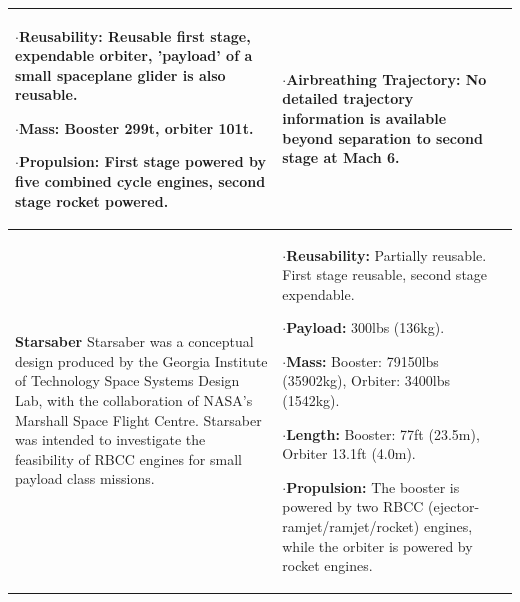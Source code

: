 {\begin{landscape}
\begin{xltabular}{\linewidth}{|X|X|X|}
$\cdot$\textbf{Reusability:} Reusable first stage, expendable orbiter, 'payload' of a small spaceplane glider is also reusable. 

$\cdot$\textbf{Mass:} Booster 299t, orbiter 101t. 

$\cdot$\textbf{Propulsion:} First stage powered by five combined cycle engines, second stage rocket powered. 
	
	&\small
	$\cdot$\textbf{Airbreathing Trajectory:} No detailed trajectory information is available beyond separation to second stage at Mach 6. 
	
	\\
	\hline \small 
	\textbf{Starsaber}\cite{Germain2001}\newline\newline
	Starsaber was a conceptual design produced by the Georgia Institute of Technology Space Systems Design Lab, with the collaboration of NASA's Marshall Space Flight Centre. Starsaber was intended to investigate the feasibility of RBCC engines for small payload class missions. 
	&\small
	
	$\cdot$\textbf{Reusability:} Partially reusable. First stage reusable, second stage expendable. 
	
	$\cdot$\textbf{Payload:} 300lbs (136kg). 
	
	$\cdot$\textbf{Mass:} Booster: 79150lbs (35902kg), Orbiter: 3400lbs (1542kg). 
	
	$\cdot$\textbf{Length:} Booster: 77ft (23.5m), Orbiter 13.1ft (4.0m).
	
	$\cdot$\textbf{Propulsion:} The booster is powered by two RBCC (ejector-ramjet/ramjet/rocket) engines, while the orbiter is powered by rocket engines.  
	

\end{xltabular}
\end{landscape}}
